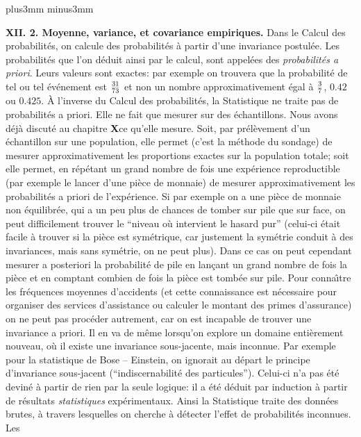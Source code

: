 \vskip6mm plus3mm minus3mm 
 
{\bf XII. 2. Moyenne, variance, et covariance empiriques.}
\medskip 
Dans le Calcul des probabilit\'es, on calcule des probabilit\'es \`a
partir d'une invariance postul\'ee. Les probabilit\'es que l'on d\'eduit 
ainsi par le calcul, sont appel\'ees des {\it probabilit\'es a priori}. 
Leurs valeurs sont exactes: par exemple on trouvera que la probabilit\'e 
de tel ou tel \'ev\'enement est $31 \over 73$ et non un nombre 
approximativement \'egal \`a $3 \over 7$, $0.42$ ou $0.425$. 
\medskip 
\`A l'inverse du Calcul des probabilit\'es, la Statistique ne traite pas
de probabilit\'es a priori. Elle ne fait que mesurer sur des 
\'echantillons. Nous avons d\'ej\`a discut\'e au chapitre {\bf X}\a ce 
qu'elle mesure.  Soit, par pr\'el\`evement d'un \'echantillon sur une 
population, elle permet (c'est la m\'ethode du sondage) de mesurer 
approximativement les proportions exactes sur la population totale; 
soit elle permet, en r\'ep\'etant un grand nombre de fois une 
exp\'erience reproductible (par exemple le lancer d'une pi\`ece de 
monnaie) de mesurer approximativement les probabilit\'es a priori de 
l'exp\'erience. Si par exemple on a une pi\`ece de monnaie non 
\'equilibr\'ee, qui a un peu plus de chances de tomber sur pile que sur 
face, on peut difficilement trouver le ``niveau o\`u intervient le hasard 
pur'' (celui-ci \'etait facile \`a trouver si la pi\`ece est sym\'etrique, 
car justement la sym\'etrie conduit \`a des invariances,  mais sans 
sym\'etrie, on ne peut plus).  Dans ce cas on peut cependant mesurer a 
posteriori la probabilit\'e de pile en lan\c{c}ant un grand nombre de 
fois la pi\`ece et en comptant combien de fois la pi\`ece est tomb\'ee 
sur pile. Pour conna{\^\i}tre les fr\'equences moyennes d'accidents
(et cette connaissance est n\'ecessaire pour organiser des services 
d'assistance ou calculer le montant des primes d'assurance) 
on ne peut pas proc\'eder autrement, car on est incapable de trouver 
une invariance a priori. Il en va de m\^eme lorsqu'on explore un 
domaine enti\`erement nouveau, o\`u il existe une invariance 
sous-jacente, mais inconnue. Par exemple pour la statistique de
Bose -- Einstein, on ignorait au d\'epart le principe d'invariance 
sous-jacent (``indiscernabilit\'e des particules''). Celui-ci n'a pas 
\'et\'e devin\'e \`a partir de rien par la seule logique: il a \'et\'e 
d\'eduit par induction \`a partir de r\'esultats {\it statistiques} 
exp\'erimentaux. 
\medskip 
Ainsi la Statistique traite des donn\'ees brutes, \`a travers lesquelles
on cherche \`a d\'etecter l'effet de probabilit\'es inconnues. Les
